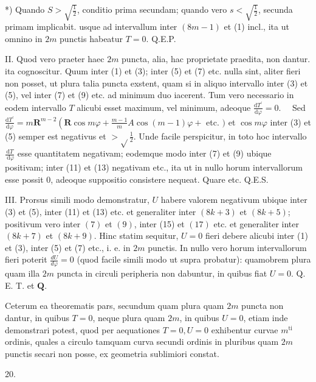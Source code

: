 \documentclass[10pt]{article}
\begin{document}
*) Quando \(S>\sqrt{\frac{1}{2}}\), conditio prima secundam; quando vero \(s<\sqrt{\frac{1}{2}}\), secunda primam implicabit.
usque ad intervallum inter \((8 m-1)\) et (1) incl., ita ut omnino in \(2 m\) punctis habeatur \(T=0\). Q.E.P.

II. Quod vero praeter haec \(2 m\) puncta, alia, hac proprietate praedita, non dantur. ita cognoscitur. Quum inter (1) et (3); inter (5) et (7) etc. nulla sint, aliter fieri non posset, ut plura talia puncta exstent, quam si in aliquo intervallo inter (3) et (5), vel inter (7) et (9) etc. ad minimum duo iacerent. Tum vero necessario in eodem intervallo \(T\) alicubi esset maximum, vel minimum, adeoque \(\frac{\mathrm{d} T^{\prime}}{\mathrm{d} \varphi}=0 . \quad\) Sed \(\frac{\mathrm{d} T^{\prime}}{\mathrm{d} \varphi}=m \boldsymbol{R}^{m-2}\left(\boldsymbol{R} \cos m \varphi+\frac{m-1}{m} A \cos (m-1) \varphi+\right.\) etc. \()\) et \(\cos m \varphi\) inter (3) et (5) semper est negativus et \(>\sqrt{ } \frac{1}{2}\). Unde facile perspicitur, in toto hoc intervallo \(\frac{\mathrm{d} T}{\mathrm{~d} \varphi}\) esse quantitatem negativam; eodemque modo inter (7) et (9) ubique positivam; inter (11) et (13) negativam etc., ita ut in nullo horum intervallorum esse possit 0, adeoque suppositio consistere nequeat. Quare etc. Q.E.S.

III. Prorsus simili modo demonstratur, \(U\) habere valorem negativum ubique inter (3) et (5), inter (11) et (13) etc. et generaliter inter \((8 k+3)\) et \((8 k+5)\); positivum vero inter \((7)\) et \((9)\), inter (15) et \((17)\) etc. et generaliter inter \((8 k+7)\) et \((8 k+9)\). Hinc statim sequitur, \(U=0\) fieri debere alicubi inter (1) et (3), inter (5) et (7) etc., i. e. in \(2 m\) punctis. In nullo vero horum intervallorum fieri poterit \(\frac{d U}{d \varphi}=0\) (quod facile simili modo ut supra probatur): quamobrem plura quam illa \(2 m\) puncta in circuli peripheria non dabuntur, in quibus fiat \(U=0\). Q. E. T. et \(\mathbf{Q}\).

Ceterum ea theorematis pars, secundum quam plura quam \(2 m\) puncta non dantur, in quibus \(T=0\), neque plura quam \(2 m\), in quibus \(U=0\), etiam inde demonstrari potest, quod per aequationes \(T=0, U=0\) exhibentur curvae \(m^{\text {ti }}\) ordinis, quales a circulo tamquam curva secundi ordinis in pluribus quam \(2 m\) punctis secari non posse, ex geometria sublimiori constat.

20.
\end{document}
